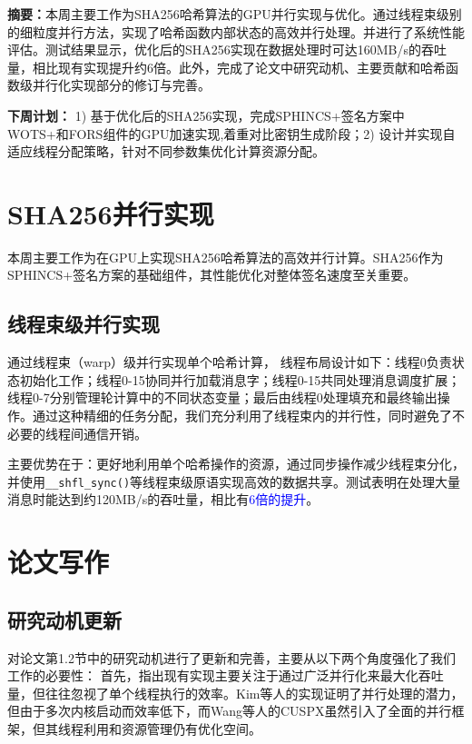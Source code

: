 \documentclass[report]{../../custom}
\begin{document}
\maketitle

\noindent \textbf{摘要：}本周主要工作为SHA256哈希算法的GPU并行实现与优化。通过线程束级别的细粒度并行方法，实现了哈希函数内部状态的高效并行处理。并进行了系统性能评估。测试结果显示，优化后的SHA256实现在数据处理时可达160MB/s的吞吐量，相比现有实现提升约6倍。此外，完成了论文中研究动机、主要贡献和哈希函数级并行化实现部分的修订与完善。

\vskip 0.5cm

\noindent \textbf{下周计划：} 1) 基于优化后的SHA256实现，完成SPHINCS+签名方案中WOTS+和FORS组件的GPU加速实现,着重对比密钥生成阶段；2) 设计并实现自适应线程分配策略，针对不同参数集优化计算资源分配。

\section{SHA256并行实现}

本周主要工作为在GPU上实现SHA256哈希算法的高效并行计算。SHA256作为SPHINCS+签名方案的基础组件，其性能优化对整体签名速度至关重要。

\subsection{线程束级并行实现}

通过线程束（warp）级并行实现单个哈希计算，
线程布局设计如下：线程0负责状态初始化工作；线程0-15协同并行加载消息字；线程0-15共同处理消息调度扩展；线程0-7分别管理轮计算中的不同状态变量；最后由线程0处理填充和最终输出操作。通过这种精细的任务分配，我们充分利用了线程束内的并行性，同时避免了不必要的线程间通信开销。

主要优势在于：更好地利用单个哈希操作的资源，通过同步操作减少线程束分化，并使用\texttt{\_\_shfl\_sync()}等线程束级原语实现高效的数据共享。测试表明在处理大量消息时能达到约120MB/s的吞吐量，相比\cite{Wang2025}有\textcolor{blue}{6倍的提升}。

\section{论文写作}

\subsection{研究动机更新}

对论文第1.2节中的研究动机进行了更新和完善，主要从以下两个角度强化了我们工作的必要性：
首先，指出现有实现主要关注于通过广泛并行化来最大化吞吐量，但往往忽视了单个线程执行的效率。Kim等人的实现证明了并行处理的潜力，但由于多次内核启动而效率低下，而Wang等人的CUSPX虽然引入了全面的并行框架，但其线程利用和资源管理仍有优化空间。
\end{document}
